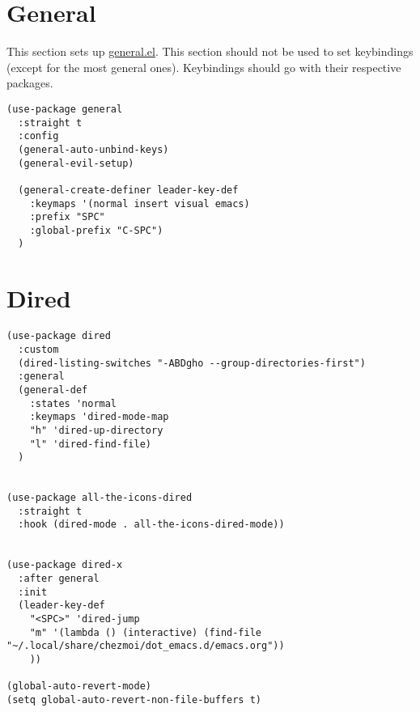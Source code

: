 \documentclass[11pt]{article}
\begin{document}
\section{General}
\label{sec:orgad0d465}
This section sets up \href{https://github.com/noctuid/general.el}{general.el}. This section should not be used to set keybindings (except for the most general ones).
Keybindings should go with their respective packages.
\begin{verbatim}
(use-package general
  :straight t
  :config
  (general-auto-unbind-keys)
  (general-evil-setup)

  (general-create-definer leader-key-def
    :keymaps '(normal insert visual emacs)
    :prefix "SPC"
    :global-prefix "C-SPC")
  )
\end{verbatim}

\section{Dired}
\label{sec:orgc38ddf1}
\begin{verbatim}
(use-package dired
  :custom
  (dired-listing-switches "-ABDgho --group-directories-first")
  :general
  (general-def
    :states 'normal
    :keymaps 'dired-mode-map
    "h" 'dired-up-directory
    "l" 'dired-find-file)
  )


(use-package all-the-icons-dired
  :straight t
  :hook (dired-mode . all-the-icons-dired-mode))


(use-package dired-x
  :after general
  :init
  (leader-key-def
    "<SPC>" 'dired-jump
    "m" '(lambda () (interactive) (find-file "~/.local/share/chezmoi/dot_emacs.d/emacs.org"))
    ))

(global-auto-revert-mode)
(setq global-auto-revert-non-file-buffers t)
\end{verbatim}
\end{document}
